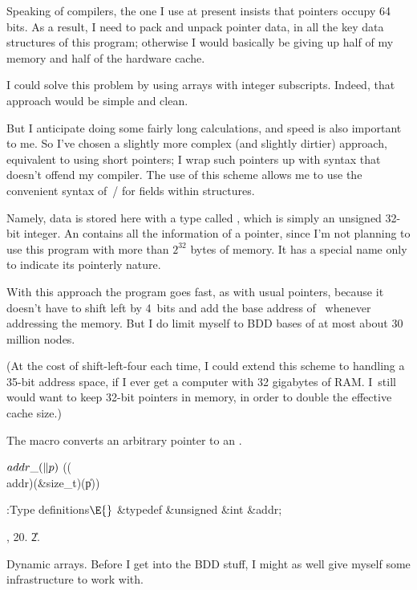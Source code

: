 Speaking of compilers, the one I use at present insists that
pointers occupy 64 bits. As a result, I need to pack and unpack
pointer data, in all the key data structures of this program;
otherwise I would basically be giving up half of my memory and half
of the hardware cache.

I could solve this problem by using arrays with integer subscripts.
Indeed, that approach would be simple and clean.

But I anticipate doing some fairly long calculations, and
speed is also important to me. So I've chosen a slightly more
complex (and slightly dirtier) approach, equivalent to using
short pointers; I wrap such pointers up with syntax that doesn't
offend my compiler. The use of this scheme allows me to use
the convenient syntax of~\CEE/ for fields within structures.

Namely, data is stored here with a type called , which is simply
an unsigned 32-bit integer. An  contains
all the information of a pointer, since I'm not planning to use
this program with more than $2^{32}$ bytes of memory.
It has a special name only to indicate its pointerly nature.

With this approach the program goes fast, as with usual pointers,
because it doesn't have to shift left by 4~bits and add the base
address of~ whenever addressing the memory. But I do limit
myself to BDD bases of at most about 30 million nodes.

(At the cost of shift-left-four each time, I could extend this
scheme to handling a 35-bit address space, if I ever get a
computer with 32 gigabytes of RAM. I~still would want to keep
32-bit pointers in memory, in order to double the effective cache size.)

The  macro converts an arbitrary pointer to an .

\Y\B\4\D$\\{addr\_}(\|p)$ \5
((\\{addr})(\&{size\_t})(\|p))\par
\Y\B\4:Type definitions\X${}\E{}$\6
\&{typedef} \&{unsigned} \&{int} \&{addr};\par
{}, 20.
\U2.\fi

Dynamic arrays. Before I get into the BDD stuff, I might as well
give myself some infrastructure to work with.

